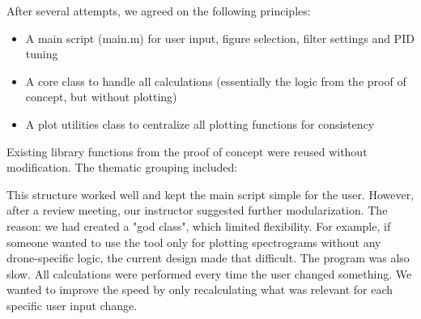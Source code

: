 \documentclass[a4paper,11pt]{scrartcl}
\begin{document}
After several attempts, we agreed on the following principles:

\begin{itemize}
	\item A main script (main.m) for user input, figure selection, filter settings and PID tuning
	\item A core class to handle all calculations (essentially the logic from the proof of concept, but without plotting)
	\item A plot utilities class to centralize all plotting functions for consistency
\end{itemize}

Existing library functions from the proof of concept were reused without modification. The thematic grouping included:
\\

This structure worked well and kept the main script simple for the user.
However, after a review meeting, our instructor suggested further modularization.
The reason: we had created a "god class", which limited flexibility. For example,
if someone wanted to use the tool only for plotting spectrograms without any drone-specific logic, the current design made that difficult.
The program was also slow. All calculations were performed every time the user changed something.
We wanted to improve the speed by only recalculating what was relevant for each specific user input change.
\end{document}
